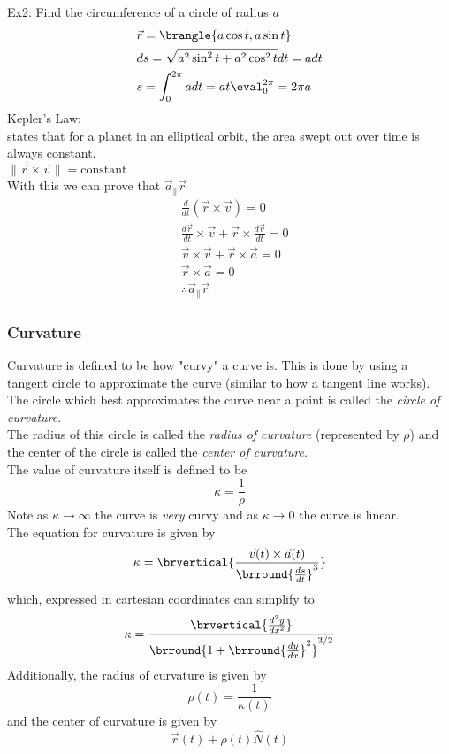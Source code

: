 Ex2: Find the circumference of a circle of radius $a$
\begin{align*}
    &\vec{r}=\brangle{a\cos t,a\sin t}\\
    &ds=\sqrt{a^2\sin^2t+a^2\cos^2t}dt=adt\\
    &s=\int_0^{2\pi}adt=at\eval_0^{2\pi}=2\pi a
\end{align*}
Kepler's Law:\\
states that for a planet in an elliptical orbit, the area swept out over time is always constant.\\
$\|\vec{r}\times\vec{v}\|=\text{constant}$\\
With this we can prove that $\vec{a}_\parallel\vec{r}$
\begin{align*}
    &\frac{d}{dt}(\vec{r}\times\vec{v})=0\\
    &\frac{d\vec{r}}{dt}\times\vec{v}+\vec{r}\times\frac{d\vec{v}}{dt}=0\\
    &\vec{v}\times\vec{v}+\vec{r}\times\vec{a}=0\\
    &\vec{r}\times\vec{a}=0\\
    &\therefore\vec{a}_\parallel\vec{r}
\end{align*}

\subsubsection{Curvature}
Curvature is defined to be how "curvy" a curve is. This is done by using a tangent circle to approximate the curve (similar to how a tangent line works).\\
The circle which best approximates the curve near a point is called the \textit{circle of curvature}.\\
The radius of this circle is called the \textit{radius of curvature} (represented by $\rho$) and the center of the circle is called the \textit{center of curvature}.\\
The value of curvature itself is defined to be
$$\kappa=\frac{1}{\rho}$$
Note as $\kappa\to\infty$ the curve is \textit{very} curvy and as $\kappa\to0$ the curve is linear.\\
The equation for curvature is given by
$$\kappa=\brvertical{\frac{\vec{v}(t)\times\vec{a}(t)}{\brround{\frac{ds}{dt}}^3}}$$
which, expressed in cartesian coordinates can simplify to
$$\kappa=\frac{\brvertical{\frac{d^2y}{dx^2}}}{\brround{1+\brround{\frac{dy}{dx}}^2}^{3/2}}$$
Additionally, the radius of curvature is given by
$$\rho(t)=\frac{1}{\kappa(t)}$$
and the center of curvature is given by
$$\vec{r}(t)+\rho(t)\hat{N}(t)$$
